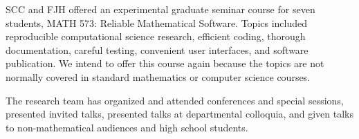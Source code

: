 \documentclass[11pt]{NSFamsart}
\begin{document}
SCC and FJH offered an experimental graduate seminar course for seven students, MATH 573: Reliable Mathematical Software. Topics included reproducible computational science research, efficient coding, thorough documentation, careful testing, convenient user interfaces, and software publication.  We intend to offer this course again because the topics are not normally covered in standard mathematics or computer science courses.

The research team has organized and attended conferences and special sessions, presented invited talks, presented talks at departmental colloquia, and given talks to non-mathematical audiences and high school students.

\end{document}
